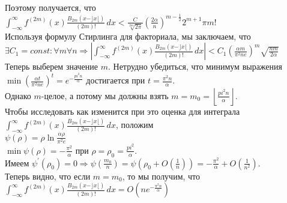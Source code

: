 \documentclass{report}
\begin{document}
Поэтому получается, что \\
$\int_{-\infty}^{\infty}f^{(2m)}(x)\frac{B_{2m}(x-\rfloor{x}\lfloor)}{(2m)!}\,dx<\frac{C}{\sqrt[2m]{2\pi}}\left(\frac{2\alpha}{n}\right)^{m-\frac{1}{2}}2^{m+1}\pi{m!}$ \\
Используя формулу Стирлинга для факториала, мы заключаем, что \\
$\exists{C_1=const}:\forall{m}\forall{n}\Rightarrow|\int_{-\infty}^{\infty}f^{(2m)}(x)\frac{B_{2m}(x-\rfloor{x}\lfloor)}{(2m)!}\,dx|<C_1\left(\frac{\alpha{m}}{\pi^2ne}\right)^{m}\sqrt{\frac{nm}{2\alpha}}$ \\
Теперь выберем значение $m$. Нетрудно убедиться, что минимум выражения $\min\left(\frac{\alpha{t}}{\pi^2ne}\right)^{t}=e^{-\frac{pi^2n}{\alpha}}$ достигается при $t=\frac{\pi^2n}{\alpha}$. \\
Однако $m$-целое, а потому мы должны взять $m=m_0=\left\lfloor\frac{pi^2n}{\alpha}\right\rfloor$. \\
Чтобы исследовать как изменится при это оценка для интеграла $\int_{-\infty}^{\infty}f^{(2m)}(x)\frac{B_{2m}(x-\rfloor{x}\lfloor)}{(2m)!}\,dx$, положим \\
$\psi(\rho)=\rho\ln\frac{\alpha\rho}{\pi^2e}$ \\
$\min\psi(\rho)=-\frac{\pi^2}{\alpha}$ при $\rho=\rho_0=\frac{pi^2}{\alpha}$. \\
Имеем $\psi^\prime(\rho_0)=0\Rightarrow\psi\left(\frac{m_0}{n}\right)=\psi\left(\rho_0+O\left(\frac{1}{n}\right)\right)=-\frac{\pi^2}{\alpha}+O\left(\frac{1}{n^2}\right)$. \\
Теперь видно, что если $m=m_0$, то мы получим, что \\
$\int_{-\infty}^{\infty}f^{(2m)}(x)\frac{B_{2m}(x-\rfloor{x}\lfloor)}{(2m)!}\,dx=O\left(ne^{-\frac{\pi^2n}{\alpha}}\right)$
\newpage
\end{document}
